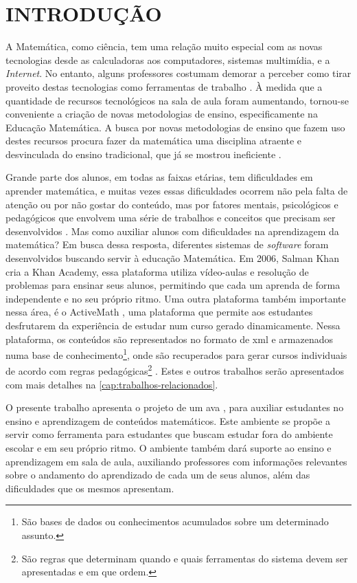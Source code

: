 \chapter{INTRODUÇÃO}
\label{cap:introducao}

A Matemática, como ciência, tem uma relação muito especial com as novas tecnologias desde as calculadoras aos computadores, sistemas 
multim\'idia, e a \textit{Internet}. No entanto, alguns professores costumam demorar a perceber como tirar proveito destas tecnologias como 
ferramentas de trabalho \cite{da1997ensino}. \`A medida que a quantidade de recursos tecnológicos na sala de aula foram aumentando, 
tornou-se conveniente a criação de novas metodologias de ensino, especificamente na Educação Matemática. A busca por novas 
metodologias de ensino que fazem uso destes recursos procura fazer da matemática uma disciplina atraente e desvinculada do ensino 
tradicional, que já se mostrou ineficiente \cite{silva2009ambiente}.

Grande parte dos alunos, em todas as faixas etárias, tem dificuldades em aprender matemática, e muitas vezes essas dificuldades ocorrem não pela falta de atenção ou por não gostar do conteúdo, mas por fatores mentais, psicológicos e pedag\'ogicos que envolvem uma série de trabalhos e conceitos que precisam ser desenvolvidos \cite{de2006dificuldades}. Mas como auxiliar alunos com dificuldades na aprendizagem da matemática? Em busca dessa resposta, diferentes sistemas de \textit{software} foram desenvolvidos buscando servir \`a  educação Matem\'atica. Em 2006, Salman Khan cria a Khan Academy, essa plataforma utiliza vídeo-aulas e resolução de problemas para ensinar seus alunos, permitindo que cada um aprenda de forma independente e no seu pr\'oprio ritmo. Uma outra plataforma também  importante nessa área, \'e o ActiveMath \cite{melis2001activemath}, uma plataforma que permite aos estudantes desfrutarem da experiência de estudar num curso gerado dinamicamente. Nessa plataforma, os conte\'udos s\~ao representados no formato de \gls{xml} \cite{bray1998extensible} e armazenados numa base de conhecimento\footnote{São bases de dados ou conhecimentos acumulados sobre um determinado assunto.}, onde s\~ao recuperados para gerar cursos individuais de acordo com regras 
pedagógicas\footnote{S\~ao regras que determinam quando e quais ferramentas do sistema devem ser apresentadas e em que ordem.} 
\cite{melis2004activemath}. Estes e outros trabalhos serão apresentados com mais detalhes na \autoref{cap:trabalhos-relacionados}.

O presente trabalho apresenta o projeto de um \gls{ava} \cite{valentini2010aprendizagem}, para auxiliar 
estudantes no ensino e aprendizagem de conteúdos matemáticos. Este ambiente se propõe a servir como ferramenta para estudantes que buscam 
estudar fora do ambiente escolar e em seu próprio ritmo. O ambiente também dará suporte ao ensino e aprendizagem em sala de aula, 
auxiliando professores com informações relevantes sobre o andamento do aprendizado de cada um de seus alunos, além das dificuldades que os 
mesmos apresentam.

